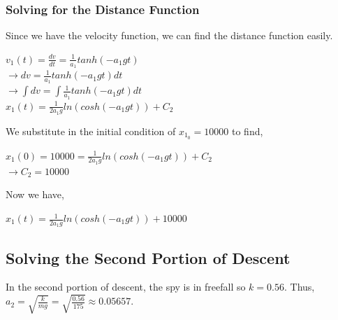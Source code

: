 \documentclass{article}
\begin{document}
	\subsubsection{Solving for the Distance Function}
	Since we have the velocity function, we can find the distance function easily.
	\begin{center}
		$v_1(t)=\frac{dv}{dt} =\frac{1}{a_1} tanh(-a_1gt)$\\
		$\rightarrow dv = \frac{1}{a_1} tanh(-a_1gt)dt$\\
		$\rightarrow \int dv = \int \frac{1}{a_1} tanh(-a_1gt)dt$\\
		$x_1(t) = \frac{1}{2a_1g} ln(cosh(-a_1gt))+C_2$
	\end{center}
	We substitute in the initial condition of $x_{1_0} =10000$ to find,
	\begin{center}
	$x_1(0) = 10000 = \frac{1}{2a_1g} ln(cosh(-a_1gt))+C_2$\\
	$\rightarrow C_2 = 10000$
	\end{center}
	Now we have,
	\begin{center}
	$x_1(t) = \frac{1}{2a_1g} ln(cosh(-a_1gt))+10000$
	\end{center}
	\subsection{Solving the Second Portion of Descent}
	In the second portion of descent, the spy is in freefall so $k = 0.56$. Thus, $a_2 = \sqrt{\frac{k}{mg}} = \sqrt{\frac{0.56}{175}} \approx 0.05657$.%
\end{document}
